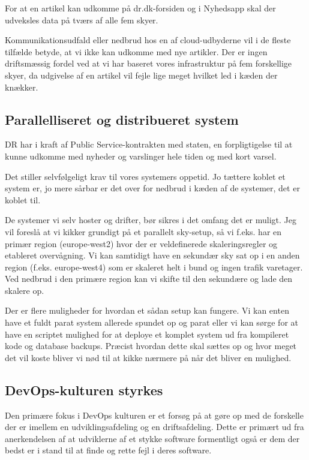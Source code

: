 \documentclass{article}
\begin{document}
For at en artikel kan udkomme på dr.dk-forsiden og i Nyhedsapp skal der udveksles data på tværs af alle fem skyer.

Kommunikationsudfald eller nedbrud hos en af cloud-udbyderne vil i de fleste tilfælde betyde, at vi ikke kan udkomme med nye artikler. Der er ingen driftsmæssig fordel ved at vi har baseret vores infrastruktur på fem forskellige skyer, da udgivelse af en artikel vil fejle lige meget hvilket led i kæden der knækker. 

\subsection{Parallelliseret og distribueret system}
DR har i kraft af Public Service-kontrakten med staten, en forpligtigelse til at kunne udkomme med nyheder og varslinger hele tiden og med kort varsel.

Det stiller selvfølgeligt krav til vores systemers oppetid. Jo tættere koblet et system er, jo mere sårbar er det over for nedbrud i kæden af de systemer, det er koblet til.

De systemer vi selv hoster og drifter, bør sikres i det omfang det er muligt. Jeg vil foreslå at vi kikker grundigt på et parallelt sky-setup, så vi f.eks. har en primær region (europe-west2) hvor der er veldefinerede skaleringsregler og etableret overvågning.
Vi kan samtidigt have en sekundær sky sat op i en anden region (f.eks. europe-west4) som er skaleret helt i bund og ingen trafik varetager.
Ved nedbrud i den primære region kan vi skifte til den sekundære og lade den skalere op.

Der er flere muligheder for hvordan et sådan setup kan fungere. Vi kan enten have et fuldt parat system allerede spundet op og parat eller vi kan sørge for at have en scriptet mulighed for at deploye et komplet system ud fra kompileret kode og database backups. Præcist hvordan dette skal sættes op og hvor meget det vil koste bliver vi nød til at kikke nærmere på når det bliver en mulighed.

\subsection{DevOps-kulturen styrkes}
Den primære fokus i DevOps kulturen er et forsøg på at gøre op med de forskelle der er imellem en udviklingsafdeling og en driftsafdeling. Dette er primært ud fra anerkendelsen af at udviklerne af et stykke software formentligt også er dem der bedst er i stand til at finde og rette fejl i deres software.
\end{document}
